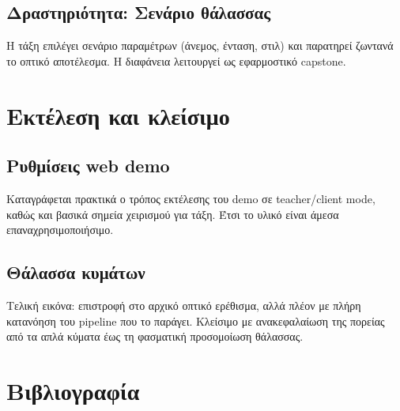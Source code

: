 \documentclass[
  a4paper,
  11pt,
]{article}
\begin{document}
\subsection{Δραστηριότητα: Σενάριο
θάλασσας}\label{ux3b4ux3c1ux3b1ux3c3ux3c4ux3b7ux3c1ux3b9ux3ccux3c4ux3b7ux3c4ux3b1-ux3c3ux3b5ux3bdux3acux3c1ux3b9ux3bf-ux3b8ux3acux3bbux3b1ux3c3ux3c3ux3b1ux3c2}

Η τάξη επιλέγει σενάριο παραμέτρων (άνεμος, ένταση, στιλ) και παρατηρεί
ζωντανά το οπτικό αποτέλεσμα. Η διαφάνεια λειτουργεί ως εφαρμοστικό
capstone.

\section{Εκτέλεση και
κλείσιμο}\label{ux3b5ux3baux3c4ux3adux3bbux3b5ux3c3ux3b7-ux3baux3b1ux3b9-ux3baux3bbux3b5ux3afux3c3ux3b9ux3bcux3bf}

\subsection{Ρυθμίσεις web
demo}\label{ux3c1ux3c5ux3b8ux3bcux3afux3c3ux3b5ux3b9ux3c2-web-demo}

Καταγράφεται πρακτικά ο τρόπος εκτέλεσης του demo σε teacher/client
mode, καθώς και βασικά σημεία χειρισμού για τάξη. Έτσι το υλικό είναι
άμεσα επαναχρησιμοποιήσιμο.

\subsection{Θάλασσα
κυμάτων}\label{ux3b8ux3acux3bbux3b1ux3c3ux3c3ux3b1-ux3baux3c5ux3bcux3acux3c4ux3c9ux3bd}

Τελική εικόνα: επιστροφή στο αρχικό οπτικό ερέθισμα, αλλά πλέον με πλήρη
κατανόηση του pipeline που το παράγει. Κλείσιμο με ανακεφαλαίωση της
πορείας από τα απλά κύματα έως τη φασματική προσομοίωση θάλασσας.

\section{Βιβλιογραφία}\label{ux3b2ux3b9ux3b2ux3bbux3b9ux3bfux3b3ux3c1ux3b1ux3c6ux3afux3b1}

\label{refs}
\end{document}
